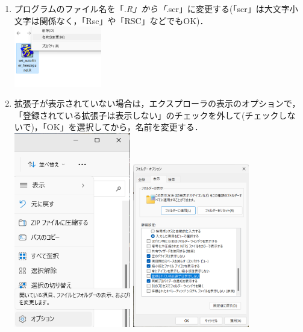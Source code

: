 \documentclass[
]{article}
\providecommand{\tightlist}{%
  \setlength{\itemsep}{0pt}\setlength{\parskip}{0pt}}
\begin{document}
\begin{enumerate}
\def\labelenumi{\arabic{enumi}.}
\tightlist
\item
  プログラムのファイル名を「\emph{.R」から「}.scr」に変更する(「scr」は大文字小文字は関係なく，「Rsc」や「RSC」などでもOK)．\\
  \includegraphics[width=0.3\textwidth,height=\textheight]{img/assoc_01.png}
\item
  拡張子が表示されていない場合は，エクスプローラの表示のオプションで，「登録されている拡張子は表示しない」のチェックを外して(チェックしないで)，「OK」を選択してから，名前を変更する．\\
  \includegraphics[width=0.4\textwidth,height=\textheight]{img/assoc_00_01.png}
  \includegraphics[width=0.4\textwidth,height=\textheight]{img/assoc_00_02.png}

\end{enumerate}
\end{document}
